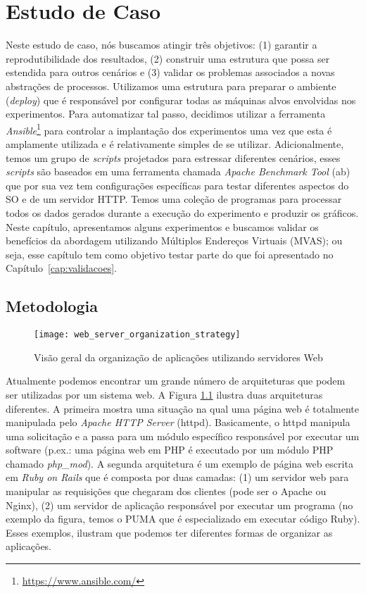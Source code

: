 \chapter{Estudo de Caso}
\label{cap:estudo-de-caso}

Neste estudo de caso, nós buscamos atingir três objetivos: (1) garantir a
reprodutibilidade dos resultados, (2) construir uma estrutura que possa ser
estendida para outros cenários e (3) validar os problemas associados a novas
abstrações de processos. Utilizamos uma estrutura para preparar o ambiente
(\emph{deploy}) que é responsável por configurar todas as máquinas alvos
envolvidas nos experimentos. Para automatizar tal passo, decidimos utilizar a
ferramenta \emph{Ansible}\footnote{\url{https://www.ansible.com/}} para
controlar a implantação dos experimentos uma vez que esta é amplamente utilizada e é
relativamente simples de se utilizar. Adicionalmente, temos um grupo de \emph{scripts}
projetados para estressar diferentes cenários, esses \emph{scripts} são baseados em
uma ferramenta chamada \emph{Apache Benchmark Tool} (ab) que por sua vez tem
configurações específicas para testar diferentes aspectos do SO e de um servidor
HTTP. Temos uma coleção de programas para processar todos os dados gerados
durante a execução do experimento e produzir os gráficos. Neste capítulo,
apresentamos alguns experimentos e buscamos validar os benefícios da abordagem
utilizando Múltiplos Endereços Virtuais (MVAS); ou seja, esse capítulo tem como
objetivo testar parte do que foi apresentado no Capítulo~\ref{cap:validacoes}.

\section{Metodologia} \label{sec:metodologia}

\begin{figure}[!h] \centering
  \texttt{[image: web\_server\_organization\_strategy]}
  \caption{Visão geral da organização de aplicações utilizando servidores Web}
\label{fig:web_server} \end{figure}

Atualmente podemos encontrar um grande número de arquiteturas que podem ser
utilizadas por um sistema web. A Figura \ref{fig:web_server} ilustra duas
arquiteturas diferentes. A primeira mostra uma situação na qual uma página web
é totalmente manipulada pelo \emph{Apache HTTP Server} (httpd). Basicamente, o httpd manipula uma
solicitação e a passa para um módulo específico responsável por executar um
software (p.ex.: uma página web em PHP é executado por um módulo PHP chamado
\emph{php\_mod}). A segunda arquitetura é um exemplo de página web escrita em
\emph{Ruby on Rails} que é composta por duas camadas: (1) um servidor web para
manipular as requisições que chegaram dos clientes (pode ser o Apache ou
Nginx), (2) um servidor de aplicação responsável por executar um programa (no
exemplo da figura, temos o PUMA que é especializado em executar código Ruby).
Esses exemplos, ilustram que podemos ter diferentes formas de organizar as
aplicações.

